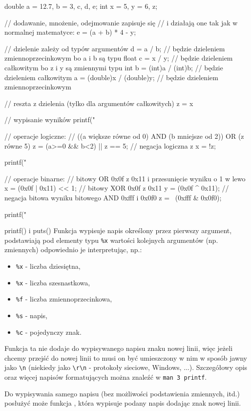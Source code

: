 \begin{CodeFrame*}[c]{}
double a = 12.7, b = 3, c, d, e;
int x = 5, y = 6, z;

// dodawanie, mnożenie, odejmowanie zapisuje się
// i działają one tak jak w normalnej matematyce:
e = (a + b) * 4 - y;

// dzielenie zależy od typów argumentów
d = a / b; // będzie dzieleniem zmiennoprzecinkowym bo a i b są typu float
c = x / y; // będzie dzieleniem całkowitym bo z i y są zmiennymi typu int
b = (int)a / (int)b; // będzie dzieleniem całkowitym
a = (double)x / (double)y; // będzie dzieleniem zmiennoprzecinkowym

// reszta z dzielenia (tylko dla argumentów całkowitych)
z = x %

// wypisanie wyników
printf("%

// operacje logiczne:
// ((a większe równe od 0) AND (b mniejsze od 2)) OR (z równe 5)
z = (a>=0 && b<2) || z == 5;
// negacja logiczna z
x = !z;

printf("%

// operacje binarne:
// bitowy OR 0x0f z 0x11 i przesunięcie wyniku o 1 w lewo
x = (0x0f | 0x11) << 1;
// bitowy XOR 0x0f z 0x11
y = (0x0f ^ 0x11);
// negacja bitowa wyniku bitowego AND 0xfff i 0x0f0
z = ~(0xfff & 0x0f0);

printf("%
\end{CodeFrame*}

\begin{ProTip}{printf() i puts()}
Funkcja  wypisuje napis określony przez pierwszy argument, podstawiają pod elementy typu \Verb#%
\begin{itemize}
	\item \Verb#%
	\item \Verb#%
	\item \Verb#%
	\item \Verb#%
	\item \Verb#%
\end{itemize}
Funkcja ta nie dodaje do wypisywanego napisu znaku nowej linii, więc jeżeli chcemy przejść do nowej linii to musi on być umieszczony w nim w sposób jawny jako \Verb#\n# (niekiedy jako \Verb#\r\n# - protokoły sieciowe, Windows, ...).
Szczegółowy opis  oraz więcej napisów formatujących można znaleźć w \Verb#man 3 printf#.

\vspace{8pt}
Do wypisywania samego napisu (bez możliwości podstawienia zmiennych, itd.) posłużyć może funkcja , która wypisuje podany napis dodając znak nowej linii.
\end{ProTip}

